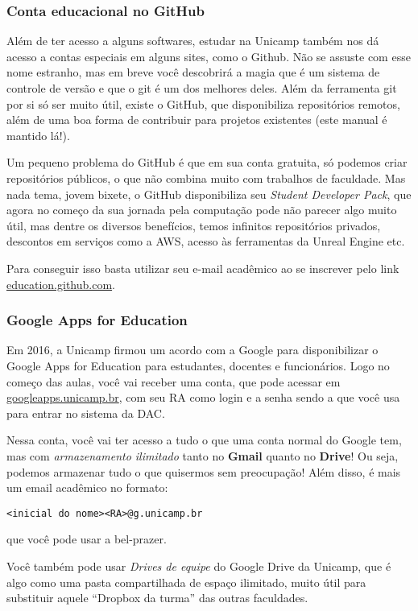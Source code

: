 \subsubsection{Conta educacional no GitHub}

Além de ter acesso a alguns softwares, estudar na Unicamp também nos dá acesso
a contas especiais em alguns sites, como o Github. Não se assuste com esse nome
estranho, mas em breve você descobrirá a magia que é um sistema de controle de
versão e que o git é um dos melhores deles. Além da ferramenta git por si só
ser muito útil, existe o GitHub, que disponibiliza repositórios remotos, além
de uma boa forma de contribuir para projetos existentes (este manual é mantido
lá!).

Um pequeno problema do GitHub é que em sua conta gratuita, só podemos criar
repositórios públicos, o que não combina muito com trabalhos de faculdade. Mas
nada tema, jovem bixete, o GitHub disponibiliza seu \emph{Student Developer
Pack}, que agora no começo da sua jornada pela computação pode não parecer algo
muito útil, mas dentre os diversos benefícios, temos infinitos repositórios
privados, descontos em serviços como a AWS, acesso às ferramentas da Unreal
Engine etc.

Para conseguir isso basta utilizar seu e-mail acadêmico ao se inscrever pelo
link \url{education.github.com}.

\subsubsection{Google Apps for Education}

Em 2016, a Unicamp firmou um acordo com a Google para disponibilizar o Google
Apps for Education para estudantes, docentes e funcionários. Logo no começo das
aulas, você vai receber uma conta, que pode acessar em
\url{googleapps.unicamp.br}, com seu RA como login e a senha sendo a que você
usa para entrar no sistema da DAC.

Nessa conta, você vai ter acesso a tudo o que uma conta normal do Google tem,
mas com \emph{armazenamento ilimitado} tanto no \textbf{Gmail} quanto no
\textbf{Drive}! Ou seja, podemos armazenar tudo o que quisermos sem
preocupação! Além disso, é mais um email acadêmico no formato:
\begin{center}
\texttt{<inicial do nome><RA>@g.unicamp.br}
\end{center}
que você pode usar a bel-prazer.

Você também pode usar \emph{Drives de equipe} do Google Drive da Unicamp, que é
algo como uma pasta compartilhada de espaço ilimitado, muito útil para
substituir aquele ``Dropbox da turma'' das outras faculdades.

